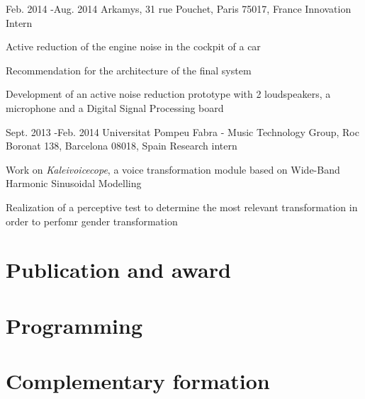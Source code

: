 \documentclass[10pt]{article} %
\begin{document}
\job
{Feb. 2014 -}{Aug. 2014}
{Arkamys, 31 rue Pouchet, Paris 75017, France }
{}
{Innovation Intern}
{
Active reduction of the engine noise in the cockpit of a car 
\begin{itemize-noindent}
\item{Recommendation for the architecture of the final system}
\item{Development of an active noise reduction prototype with 2 loudspeakers, a microphone and a Digital Signal Processing board}
\end{itemize-noindent}
}


\job
{Sept. 2013 -}{Feb. 2014}
{Universitat Pompeu Fabra - Music Technology Group, Roc Boronat 138, Barcelona 08018, Spain}
{}
{Research intern}
{Work on \textit{Kaleivoicecope}, a voice transformation module based on Wide-Band Harmonic Sinusoidal Modelling
\begin{itemize-noindent}
\item{Realization of a perceptive test to determine the most relevant transformation in order to perfomr gender transformation}
\end{itemize-noindent}
}

\section{Publication and award}



\section{Programming}

\section{Complementary formation}

\end{document}

